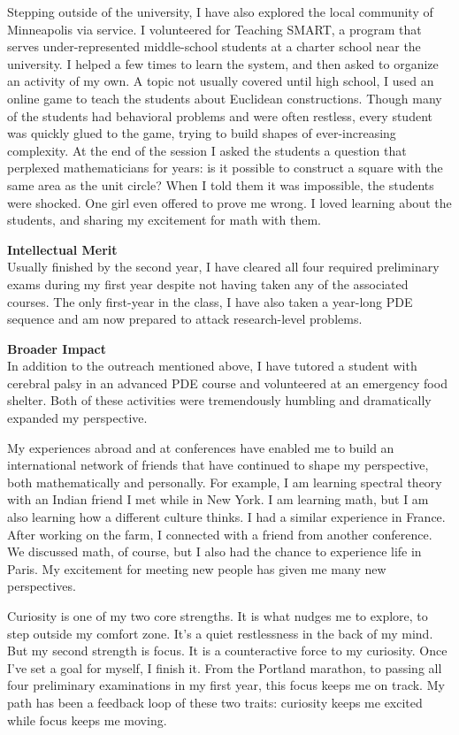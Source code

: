 \documentclass[12pt]{article}
\begin{document}
Stepping outside of the university, I have also explored the local community of Minneapolis via service. I volunteered for Teaching SMART, a program that serves under-represented middle-school students at a charter school near the university. I helped a few times to learn the system, and then asked to organize an activity of my own. A topic not usually covered until high school, I used an online game to teach the students about Euclidean constructions. Though many of the students had behavioral problems and were often restless, every student was quickly glued to the game, trying to build shapes of ever-increasing complexity. At the end of the session I asked the students a question that perplexed mathematicians for years: is it possible to construct a square with the same area as the unit circle? When I told them it was impossible, the students were shocked. One girl even offered to prove me wrong. I loved learning about the students, and sharing my excitement for math with them.


\textbf{Intellectual Merit}\\
Usually finished by the second year, I have cleared all four required preliminary exams during my first year despite not having taken any of the associated courses. The only first-year in the class, I have also taken a year-long PDE sequence and am now prepared to attack research-level problems. 

\textbf{Broader Impact}\\
In addition to the outreach mentioned above, I have tutored a student with cerebral palsy in an advanced PDE course and volunteered at an emergency food shelter. Both of these activities were tremendously humbling and dramatically expanded my perspective.

My experiences abroad and at conferences have enabled me to build an international network of friends that have continued to shape my perspective, both mathematically and personally. For example, I am learning spectral theory with an Indian friend I met while in New York. I am learning math, but I am also learning how a different culture thinks. I had a similar experience in France. After working on the farm, I connected with a friend from another conference. We discussed math, of course, but I also had the chance to experience life in Paris. My excitement for meeting new people has given me many new perspectives.

Curiosity is one of my two core strengths. It is what nudges me to explore, to step outside my comfort zone. It's a quiet restlessness in the back of my mind. But my second strength is focus. It is a counteractive force to my curiosity. Once I've set a goal for myself, I finish it. From the Portland marathon, to passing all four preliminary examinations in my first year, this focus keeps me on track. My path has been a feedback loop of these two traits: curiosity keeps me excited while focus keeps me moving. 
\end{document}
